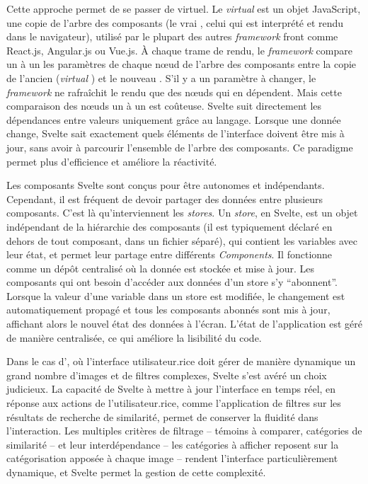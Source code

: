 Cette approche permet de se passer de \dom virtuel. Le \textit{virtual \dom} est un
objet JavaScript, une copie de l'arbre des composants (le vrai \dom,
celui qui est interprété et rendu dans le navigateur), utilisé par le
plupart des autres \textit{framework} front comme React.js, Angular.js ou
Vue.js. À chaque trame de rendu, le \textit{framework} compare un à un les
paramètres de chaque nœud de l'arbre des composants entre la copie de
l'ancien (\textit{virtual \dom}) et le nouveau \dom. S'il y a un paramètre à
changer, le \textit{framework} ne rafraîchit le rendu que des nœuds qui en
dépendent. Mais cette comparaison des nœuds un à un est coûteuse. Svelte
suit directement les dépendances entre valeurs uniquement grâce au
langage. Lorsque une donnée change, Svelte sait exactement quels
éléments de l'interface doivent être mis à jour, sans avoir à parcourir
l'ensemble de l'arbre des composants. Ce paradigme permet plus
d'efficience et améliore la réactivité.

Les composants Svelte sont conçus pour être autonomes et indépendants.
Cependant, il est fréquent de devoir partager des données entre
plusieurs composants. C'est là qu'interviennent les \textit{stores}. Un \textit{store}, en
Svelte, est un objet indépendant de la hiérarchie des composants (il est
typiquement déclaré en dehors de tout composant, dans un fichier
séparé), qui contient les variables avec leur état, et permet leur
partage entre différents \textit{Components}. Il fonctionne comme un dépôt
centralisé où la donnée est stockée et mise à jour. Les composants qui
ont besoin d'accéder aux données d'un store s'y ``abonnent''. Lorsque la
valeur d'une variable dans un store est modifiée, le changement est
automatiquement propagé et tous les composants abonnés sont mis à jour,
affichant alors le nouvel état des données à l'écran. L'état de
l'application est géré de manière centralisée, ce qui améliore la
lisibilité du code.

Dans le cas d'\aikon, où l'interface utilisateur.rice doit gérer de manière
dynamique un grand nombre d'images et de filtres complexes, Svelte s'est
avéré un choix judicieux. La capacité de Svelte à mettre à jour
l'interface en temps réel, en réponse aux actions de l'utilisateur.rice,
comme l'application de filtres sur les résultats de recherche de
similarité, permet de conserver la fluidité dans l'interaction. Les
multiples critères de filtrage -- témoins à comparer, catégories de
similarité -- et leur interdépendance -- les catégories à afficher
reposent sur la catégorisation apposée à chaque image -- rendent
l'interface particulièrement dynamique, et Svelte permet la gestion de
cette complexité.

